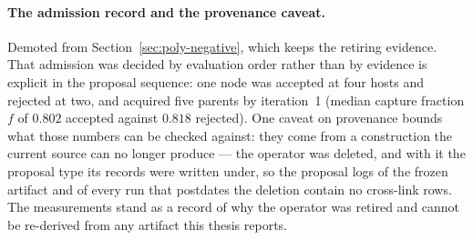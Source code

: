 \paragraph{The admission record and the provenance caveat.} Demoted
from Section~\ref{sec:poly-negative}, which keeps the retiring
evidence. That admission was decided by evaluation order rather than
by evidence is explicit in the proposal sequence: one node was
accepted at four hosts and rejected at two, and acquired five parents
by iteration~1 (median capture fraction $f$ of $0.802$ accepted
against $0.818$ rejected). One caveat on provenance bounds what those
numbers can be checked against: they come from a construction the
current source can no longer produce --- the operator was deleted, and
with it the proposal type its records were written under, so the
proposal logs of the frozen artifact and of every run that postdates
the deletion contain no cross-link rows. The measurements stand as a
record of why the operator was retired and cannot be re-derived from
any artifact this thesis reports.
